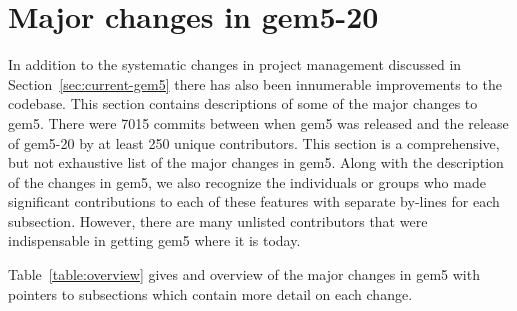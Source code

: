\section{Major changes in gem5-20}
\label{sec:changes}

In addition to the systematic changes in project management discussed in Section~\ref{sec:current-gem5} there has also been innumerable improvements to the codebase.
This section contains descriptions of some of the major changes to gem5.
There were 7015 commits between when gem5 was released and the release of gem5-20 by at least 250 unique contributors.
This section is a comprehensive, but not exhaustive list of the major changes in gem5.
Along with the description of the changes in gem5, we also recognize the individuals or groups who made significant contributions to each of these features with separate by-lines for each subsection.
However, there are many unlisted contributors that were indispensable in getting gem5 where it is today.

Table~\ref{table:overview} gives and overview of the major changes in gem5 with pointers to subsections which contain more detail on each change.

